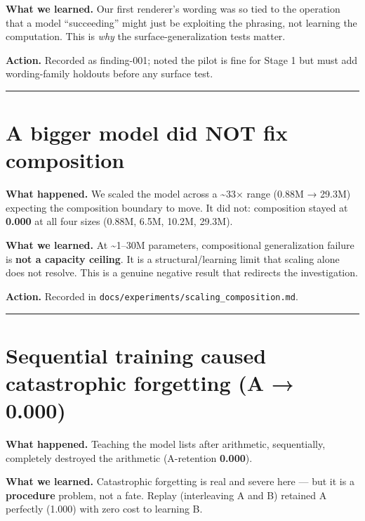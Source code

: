 \textbf{What we learned.} Our first renderer's wording was so tied to
the operation that a model ``succeeding'' might just be exploiting the
phrasing, not learning the computation. This is \emph{why} the
surface-generalization tests matter.

\textbf{Action.} Recorded as finding-001; noted the pilot is fine for
Stage 1 but must add wording-family holdouts before any surface test.

\begin{center}\rule{0.5\linewidth}{0.5pt}\end{center}

\section{A bigger model did NOT fix
composition}\label{a-bigger-model-did-not-fix-composition}

\textbf{What happened.} We scaled the model across a \textasciitilde33×
range (0.88M → 29.3M) expecting the composition boundary to move. It did
not: composition stayed at \textbf{0.000} at all four sizes (0.88M,
6.5M, 10.2M, 29.3M).

\textbf{What we learned.} At \textasciitilde1--30M parameters,
compositional generalization failure is \textbf{not a capacity ceiling}.
It is a structural/learning limit that scaling alone does not resolve.
This is a genuine negative result that redirects the investigation.

\textbf{Action.} Recorded in
\texttt{docs/experiments/scaling\_composition.md}.

\begin{center}\rule{0.5\linewidth}{0.5pt}\end{center}

\section{Sequential training caused catastrophic forgetting (A →
0.000)}\label{sequential-training-caused-catastrophic-forgetting-a-0.000}

\textbf{What happened.} Teaching the model lists after arithmetic,
sequentially, completely destroyed the arithmetic (A-retention
\textbf{0.000}).

\textbf{What we learned.} Catastrophic forgetting is real and severe
here --- but it is a \textbf{procedure} problem, not a fate. Replay
(interleaving A and B) retained A perfectly (1.000) with zero cost to
learning B.

